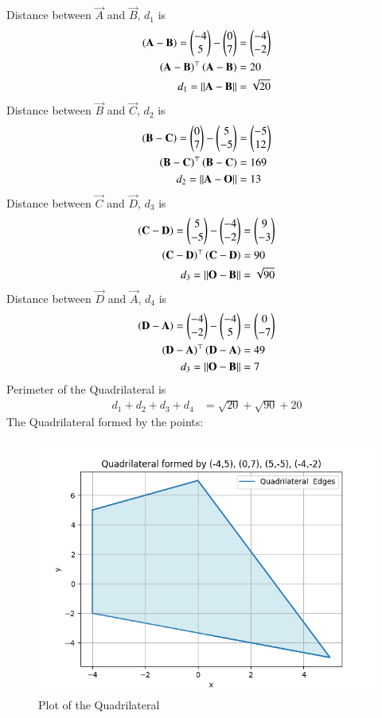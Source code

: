 \documentclass[journal]{IEEEtran}
\begin{document}
Distance between $\vec{A}$ and $\vec{B}$, $d_1$ is
\begin{align}
	\left(\mathbf{A} - \mathbf{B}\right) = \begin{pmatrix}-4\\5\end{pmatrix} - \begin{pmatrix}0\\7\end{pmatrix} &= \begin{pmatrix}-4\\-2\end{pmatrix}\\
	\left(\mathbf{A-B}\right)^\top\left(\mathbf{A-B}\right)&=20\\
    d_1=||\mathbf{A}-\mathbf{B}||&=\sqrt{20}
\end{align}
Distance between $\vec{B}$ and $\vec{C}$, $d_2$ is
\begin{align}
	\left(\mathbf{B} - \mathbf{C}\right) = \begin{pmatrix}0\\7\end{pmatrix} - \begin{pmatrix}5\\-5\end{pmatrix} &= \begin{pmatrix}-5\\12\end{pmatrix}\\
	\left(\mathbf{B-C}\right)^\top\left(\mathbf{B-C}\right)&=169\\
    d_2=||\mathbf{A}-\mathbf{O}||&=13
\end{align}
Distance between $\vec{C}$ and $\vec{D}$, $d_3$ is
\begin{align}
	\left(\mathbf{C} - \mathbf{D}\right) = \begin{pmatrix}5\\-5\end{pmatrix} - \begin{pmatrix}-4\\-2\end{pmatrix} &= \begin{pmatrix}9\\-3\end{pmatrix}\\
	\left(\mathbf{C-D}\right)^\top\left(\mathbf{C-D}\right)&=90\\
    d_3=||\mathbf{O}-\mathbf{B}||&=\sqrt{90}
\end{align}
Distance between $\vec{D}$ and $\vec{A}$, $d_4$ is
\begin{align}
	\left(\mathbf{D} - \mathbf{A}\right) = \begin{pmatrix}-4\\-2\end{pmatrix} - \begin{pmatrix}-4\\5\end{pmatrix} &= \begin{pmatrix}0\\-7\end{pmatrix}\\
	\left(\mathbf{D-A}\right)^\top\left(\mathbf{D-A}\right)&=49\\
    d_3=||\mathbf{O}-\mathbf{B}||&=7
\end{align}
Perimeter of the Quadrilateral is 
\begin{align}
    d_1+d_2+d_3+d_4&=\sqrt{20}+\sqrt{90}+20
\end{align}
The Quadrilateral formed by the points:
\begin{figure}[h!]
   \centering
   \includegraphics[width=0.7\linewidth]{figs/fig.png}
   \caption{Plot of the Quadrilateral}
   \label{stemplot}
\end{figure}  
\end{document}
